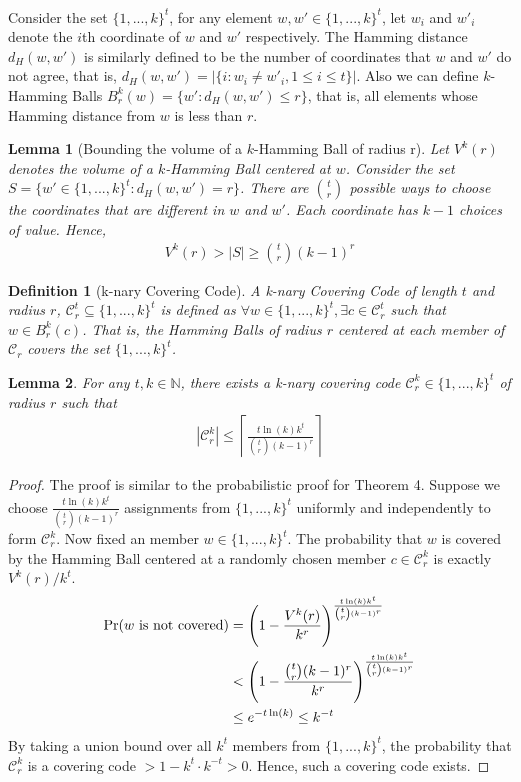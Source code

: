 \documentclass[a4paper,12pts]{article}
\newcommand{\dist}[2]{d_H(#1,#2)}
\newcommand{\ballk}[2]{B^k_{#1}(#2)}
\newcommand{\cc}{\mathcal{C}}
\newcommand{\kbits}{\{1,...,k\}}
\renewcommand{\Pr}{\textnormal{Pr}}
\newtheorem{definition}{Definition}
\newtheorem{lemma}{Lemma}
\begin{document}
\paragraph{}Consider the set $\kbits^t$, for any element $w,w' \in \kbits^t$, let $w_i$ and $w'_i$ denote the $i$th coordinate of $w$ and $w'$ respectively. The Hamming distance $\dist{w}{w'}$ is similarly defined to be the number of coordinates that $w$ and $w'$ do not agree, that is, $\dist{w}{w'} = |\{i:w_i \neq w'_i, 1\leq i \leq t \}|$. Also we can define $k$-Hamming Balls $\ballk{r}{w} = \{w':\dist{w}{w'} \leq r\}$, that is, all elements whose Hamming distance from $w$ is less than $r$. 
\begin{lemma}[Bounding the volume of a $k$-Hamming Ball of radius r]
	Let $V^k(r)$ denotes the volume of a $k$-Hamming Ball centered at $w$. Consider the set $S = \{w' \in \kbits^t: \dist{w}{w'} = r\}$. There are ${t \choose r}$ possible ways to choose the coordinates that are different in $w$ and $w'$. Each coordinate has $k-1$ choices of value. Hence,
	\begin{align*}
	V^k(r) > |S| \geq {t \choose r}(k-1)^r
	\end{align*}
\end{lemma}
\begin{definition}[k-nary Covering Code]
	A k-nary Covering Code of length $t$ and radius $r$, $\cc_r^t \subseteq \kbits^t$ is defined as $\forall w \in \kbits^t, \exists c \in \cc_r^t$ such that $w \in \ballk{r}{c}$. That is, the Hamming Balls of radius $r$ centered at each member of $\cc_r$ covers the set $\kbits^t$. 
\end{definition}
\begin{lemma}
	For any $t,k \in \mathbb{N}$, there exists a k-nary covering code $\cc^k_r \in \kbits^t$ of radius $r$ such that 
	\begin{align*}
	|\cc^k_r| \leq \left \lceil \frac{t\ln(k)k^t}{{t \choose r}(k-1)^r} \right \rceil
	\end{align*}
\end{lemma}
\begin{proof}
	The proof is similar to the probabilistic proof for Theorem 4. Suppose we choose $\frac{t\ln(k)k^t}{{t \choose r}(k-1)^r}$ assignments from $\kbits^t$ uniformly and independently to form $\cc^k_r$. Now fixed an member $w \in \kbits^t$. The probability that $w$ is covered by the Hamming Ball centered at a randomly chosen member $c \in \cc^k_r$ is exactly $V^k(r)/k^t$. 
	\begin{align*}
	\Pr(\text{$w$ is not covered}) &= \Bigg(1-\frac{V^k(r)}{k^r}\Bigg)^{\frac{t\ln(k)k^t}{{t \choose r}(k-1)^r}}\\
	&<\Bigg(1-\frac{{t \choose r}(k-1)^r}{k^r}\Bigg)^{\frac{t\ln(k)k^t}{{t \choose r}(k-1)^r}}\\
	&\leq e^{-t\ln(k)} \leq k^{-t}
	\end{align*}
	By taking a union bound over all $k^t$ members from $\kbits^t$, the probability that $\cc^k_r$ is a covering code $> 1 - k^t\cdot k^{-t} > 0$. Hence, such a covering code exists. 
\end{proof}
\end{document}
